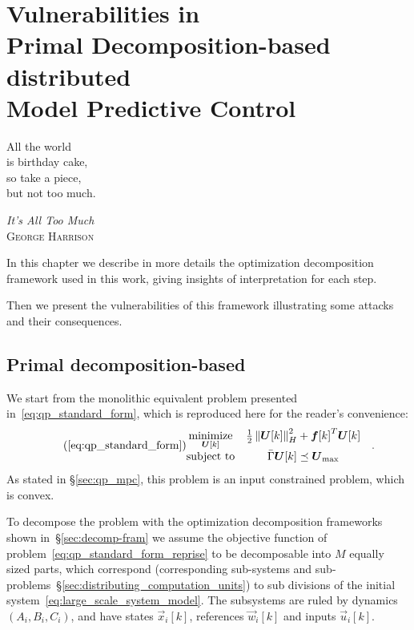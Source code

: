 \documentclass[../main.tex]{subfiles}
\begin{document}
\chapter[Vulnerabilities in Primal Decomposition-based dMPC]{Vulnerabilities in \\Primal Decomposition-based \\distributed \\Model Predictive Control}\label{sec:primal_decomposition}
\epigraph{\centering All the world\\ is birthday cake,\\ so take a piece, \\but not too much.}
{\textit{It's All Too Much}\\\textsc{George Harrison}}

In this chapter we describe in more details the optimization decomposition framework used in this work, giving insights of interpretation for each step.

Then we present the vulnerabilities of this framework illustrating some attacks and their consequences.

\minitoc

\newpage
\section{Primal decomposition-based \dmpc{}}\label{sec:decomposition_PD}

We start from the monolithic \mpc{} equivalent problem presented in~\eqref{eq:qp_standard_form}, which is reproduced here for the reader's convenience:
\begin{equation}
  \label{eq:qp_standard_form_reprise}
  \tag{\ref*{eq:qp_standard_form}}
  \begin{aligned}
    \begin{matrix}
      \minimize\limits_{\vec{U}[k]} &
      \frac{1}{2}\norm{\vec{U}[k]}^{2}_{H} + {\vec{f}[k]}^{T}\vec{U}[k] &\\
      \mathrm{subject~ to} &
\bar{\Gamma}\vec{U}[k]\preceq {\vec{U}}_{\text{max}}
    \end{matrix}
  \end{aligned}.
\end{equation}
As stated in \S\ref{sec:qp_mpc}, this problem is an input constrained \qp{} problem, which is convex.

To decompose the problem with the optimization decomposition frameworks shown in~\S\ref{sec:decomp-fram} we assume the objective function of problem~\eqref{eq:qp_standard_form_reprise} to be decomposable into $M$ equally sized parts, which correspond (corresponding sub-systems and sub-problems~\S\ref{sec:distributing_computation_units}) to sub divisions of the initial system~\eqref{eq:large_scale_system_model}.
The subsystems are ruled by dynamics $(A_{i},B_{i},C_{i})$, and have states $\vec{x}_{i}[k]$, references $\vec{w}_{i}[k]$ and inputs $\vec{u}_{i}[k]$.
\end{document}
